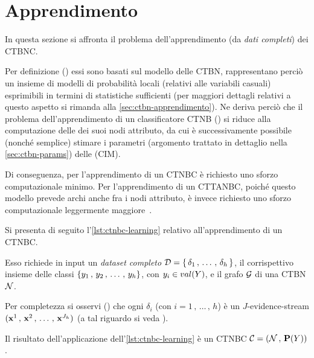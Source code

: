 \section{Apprendimento}\label{sec:learning-ctbnc}
In questa sezione si affronta il problema dell'apprendimento (da \emph{dati completi}) dei \acs{CTBNC}.

Per definizione () essi sono basati sul modello delle \acs{CTBN}, rappresentano perciò un insieme di modelli di probabilità locali (relativi alle variabili casuali) esprimibili in termini di statistiche sufficienti (per maggiori dettagli relativi a questo aspetto si rimanda alla \autoref{sec:ctbn-apprendimento}). Ne deriva perciò che il problema dell'apprendimento di un classificatore \acs{CTNB} () si riduce alla computazione delle  dei suoi nodi attributo, da cui è successivamente possibile (nonché semplice) stimare i parametri (argomento trattato in dettaglio nella \autoref{sec:ctbn-params}) delle \cim{} (\acs{CIM}).

Di conseguenza, per l'apprendimento di un \acs{CTNBC} è richiesto uno sforzo computazionale minimo. Per l'apprendimento di un \acs{CTTANBC}, poiché questo modello prevede archi anche fra i nodi attributo, è invece richiesto uno sforzo computazionale leggermente maggiore~\citep{Stella2012}.

Si presenta di seguito l'\autoref{lst:ctnbc-learning} relativo all'apprendimento di un \acs{CTNBC}.

Esso richiede in input un \emph{dataset completo} $\mathcal{D}=\{\,\delta_1\,,\,\dotsc\,,\,\delta_h\,\}$, il corrispettivo insieme delle classi $\{\mathnormal{y}_1\,,\,\mathnormal{y}_2\,,\,\dotsc\,,\,\mathnormal{y}_h\}$, con $\mathnormal{y}_i \in val(\mathnormal{Y})$, e il grafo $\mathcal{G}$ di una \acs{CTBN} $\mathcal{N}$.

Per completezza si osservi () che ogni $\delta_i$ (con $i=1\,,\,\dotsc\,,\,h$) è un $J$-evidence-stream $(\mathbf{x}^1\,,\,\mathbf{x}^2\,,\,\dotsc\,,\,\mathbf{x}^{J_h})$ (a tal riguardo si veda ).

Il risultato dell'applicazione dell'\autoref{lst:ctnbc-learning} è un \acl{CTNBC} $\mathcal{C}=(\mathcal{N}\,,\,\mathbf{P}(\mathnormal{Y}))$.

